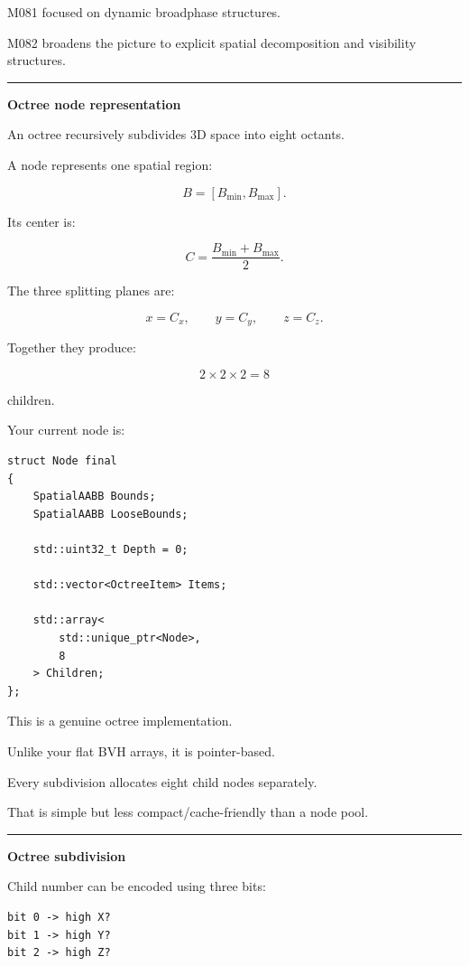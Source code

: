M081 focused on dynamic broadphase structures.

M082 broadens the picture to explicit spatial decomposition and visibility structures.

\begin{center}\rule{0.5\linewidth}{0.5pt}\end{center}

\textbf{Octree node representation}

An octree recursively subdivides 3D space into eight octants.

A node represents one spatial region:

\[
B=[B_{\min},B_{\max}].
\]

Its center is:

\[
C=\frac{B_{\min}+B_{\max}}2.
\]

The three splitting planes are:

\[
x=C_x,\qquad
y=C_y,\qquad
z=C_z.
\]

Together they produce:

\[
2\times2\times2=8
\]

children.

Your current node is:

\begin{verbatim}
struct Node final
{
    SpatialAABB Bounds;
    SpatialAABB LooseBounds;

    std::uint32_t Depth = 0;

    std::vector<OctreeItem> Items;

    std::array<
        std::unique_ptr<Node>,
        8
    > Children;
};
\end{verbatim}

This is a genuine octree implementation.

Unlike your flat BVH arrays, it is pointer-based.

Every subdivision allocates eight child nodes separately.

That is simple but less compact/cache-friendly than a node pool.

\begin{center}\rule{0.5\linewidth}{0.5pt}\end{center}

\textbf{Octree subdivision}

Child number can be encoded using three bits:

\begin{verbatim}
bit 0 -> high X?
bit 1 -> high Y?
bit 2 -> high Z?
\end{verbatim}

